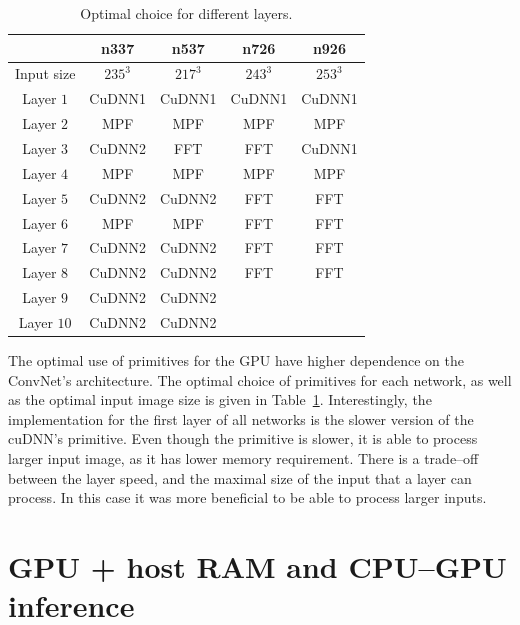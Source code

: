 \documentclass[conference]{./IEEEtran}
\begin{document}
  \begin{table}
    {\footnotesize
    \centering
    \begin{tabular}{ccccc}
      \toprule
      & n337    & n537  &  n726  &  n926 \\
      \midrule
      Input size & $235^3$ &  $217^3$  & $243^3$  & $253^3$ \\
      \midrule
      Layer $1$  &  CuDNN1  &  CuDNN1  & CuDNN1   & CuDNN1  \\
      Layer $2$  &  MPF     &  MPF     & MPF      & MPF     \\
      Layer $3$  &  CuDNN2  &  FFT     & FFT      & CuDNN1  \\
      Layer $4$  &  MPF     &  MPF     & MPF      & MPF     \\
      Layer $5$  &  CuDNN2  &  CuDNN2  & FFT      & FFT     \\
      Layer $6$  &  MPF     &  MPF     & FFT      & FFT     \\
      Layer $7$  &  CuDNN2  &  CuDNN2  & FFT      & FFT     \\
      Layer $8$  &  CuDNN2  &  CuDNN2  & FFT      & FFT     \\
      Layer $9$  &  CuDNN2  &  CuDNN2  & & \\
      Layer $10$ &  CuDNN2  &  CuDNN2  & & \\
      \bottomrule
    \end{tabular}
    \caption{Optimal choice for different layers.}
    \label{table:gpu_optimal}
    }
  \end{table}

  The optimal use of primitives for the GPU have higher dependence on
  the ConvNet's architecture.  The optimal choice of primitives for
  each network, as well as the optimal input image size is given in
  Table~\ref{table:gpu_optimal}.  Interestingly, the implementation
  for the first layer of all networks is the slower version of the
  cuDNN's primitive.  Even though the primitive is slower, it is able
  to process larger input image, as it has lower memory requirement.
  There is a trade--off between the layer speed, and the maximal size
  of the input that a layer can process.  In this case it was more
  beneficial to be able to process larger inputs.


\section{GPU + host RAM and CPU--GPU inference}
\end{document}
